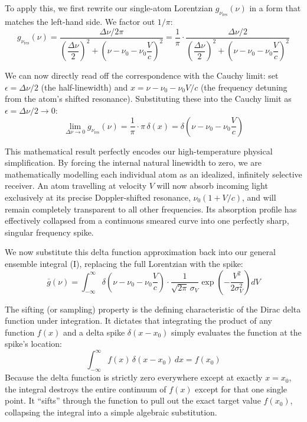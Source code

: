 To apply this, we first rewrite our single-atom Lorentzian $g_{\nu_\text{res}}(\nu)$ in a form that matches the left-hand side. We factor out $1/\pi$:
\begin{equation*}
    g_{\nu_\text{res}}(\nu)
    = \frac{\Delta\nu/2\pi}{\left(\dfrac{\Delta\nu}{2}\right)^2 + \left(\nu - \nu_0 - \nu_0\dfrac{V}{c}\right)^2}
    = \frac{1}{\pi}\cdot\frac{\Delta\nu/2}{\left(\dfrac{\Delta\nu}{2}\right)^2 + \left(\nu - \nu_0 - \nu_0\dfrac{V}{c}\right)^2}
\end{equation*}

We can now directly read off the correspondence with the Cauchy limit: set $\epsilon = \Delta\nu/2$ (the half-linewidth) and $x = \nu - \nu_0 - \nu_0 V/c$ (the frequency detuning from the atom's shifted resonance). Substituting these into the Cauchy limit as $\epsilon = \Delta\nu/2 \to 0$:
\begin{equation*}
    \lim_{\Delta\nu \to 0} g_{\nu_\text{res}}(\nu) = \frac{1}{\pi} \cdot \pi\,\delta(x) = \delta\!\left(\nu - \nu_0 - \nu_0\frac{V}{c}\right)
\end{equation*}

This mathematical result perfectly encodes our high-temperature physical simplification. By forcing the internal natural linewidth to zero, we are mathematically modelling each individual atom as an idealized, infinitely selective receiver. An atom travelling at velocity $V$ will now absorb incoming light exclusively at its precise Doppler-shifted resonance, $\nu_0(1 + V/c)$, and will remain completely transparent to all other frequencies. Its absorption profile has effectively collapsed from a continuous smeared curve into one perfectly sharp, singular frequency spike.

We now substitute this delta function approximation back into our general ensemble integral \textup{(I)}, replacing the full Lorentzian with the spike:
\begin{equation*}
    \bar{g}(\nu)
    = \int_{-\infty}^{\infty} \delta\!\left(\nu - \nu_0 - \nu_0\frac{V}{c}\right)
    \cdot \frac{1}{\sqrt{2\pi}\,\sigma_V}\exp\!\left(-\frac{V^2}{2\sigma_V^2}\right) dV
\end{equation*}

\begin{keyinsight}
    The sifting (or sampling) property is the defining characteristic of the Dirac delta function under integration. It dictates that integrating the product of any function $f(x)$ and a delta spike $\delta(x - x_0)$ simply evaluates the function at the spike's location:
    \begin{equation*}
        \int_{-\infty}^{\infty} f(x)\,\delta(x - x_0)\,dx = f(x_0)
    \end{equation*}
    Because the delta function is strictly zero everywhere except at exactly $x = x_0$, the integral destroys the entire continuum of $f(x)$ except for that one single point. It ``sifts'' through the function to pull out the exact target value $f(x_0)$, collapsing the integral into a simple algebraic substitution.
\end{keyinsight}

